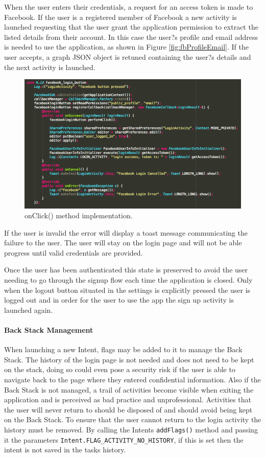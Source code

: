\documentclass[a4paper, 11pt]{article}
\begin{document}
When the user enters their credentials, a request for an access token is made to Facebook. If the user is a registered member of Facebook a new activity is launched requesting that the user grant the application permission to extract the listed details from their account. In this case the user?s profile and email address is needed to use the application, as shown in Figure \ref{fig:fbProfileEmail}. If the user accepts, a graph JSON object is retuned containing the user?s details and the next activity is launched.

\begin{figure}[h]
\centering
\includegraphics[width=\textwidth]{fbProfileEmail}
\caption{onClick() method implementation.}
\end{figure}

If the user is invalid the error will display a toast message communicating the failure to the user. The user will stay on the login page and will not be able progress until valid credentials are provided. 

Once the user has been authenticated this state is preserved to avoid the user needing to go through the signup flow each time the application is closed. Only when the logout button situated in the settings is explicitly pressed the user is logged out and in order for the user to use the app the sign up activity is launched again. 


\paragraph{Back Stack Management}
When launching a new Intent, flags may be added to it to manage the Back Stack. The history of the login page is not needed and does not need to be kept on the stack, doing so could even pose a security risk if the user is able to navigate back to the page where they entered confidential information. Also if the Back Stack is not managed, a trail of activities become visible when exiting the application and is perceived as bad practice and unprofessional. Activities that the user will never return to should be disposed of and should avoid being kept on the Back Stack. To ensure that the user cannot return to the login activity the history must be removed. By calling the Intents \texttt{addFlags()} method and passing it the parameters \texttt{Intent.FLAG\_ACTIVITY\_NO\_HISTORY}, if this is set then the intent is not saved in the tasks history.
\end{document}
